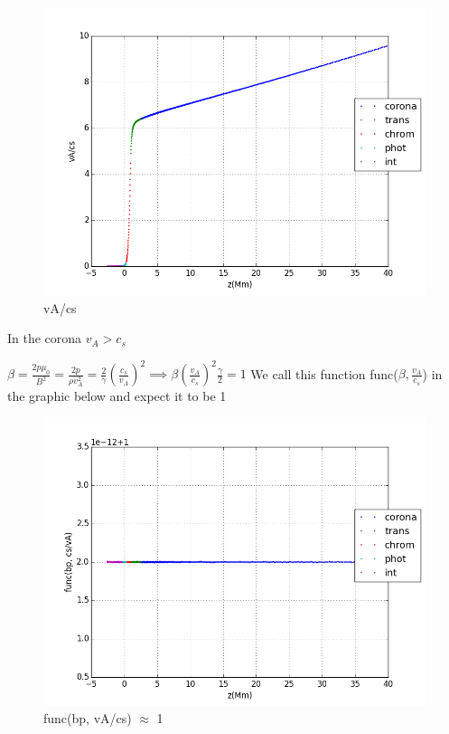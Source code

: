 \documentclass[10pt]{book}
\begin{document}
\begin{figure}[H]
 \centering
 \includegraphics[scale=0.5]{fromFile6.png}
 \caption{vA/cs}
\end{figure}

In the corona $v_A > c_s$



$\beta = \frac{2 p \mu_0}{B^2} = \frac{2 p}{\rho v_A^2} = \frac{2 }{\gamma}(\frac{c_s}{v_A})^2
\implies \beta (\frac{v_A}{c_s})^2 \frac{\gamma}{2} = 1 $
We call this function func($\beta, \frac{v_A}{c_s}$) in the graphic below and expect it to be 1



\begin{figure}[H]
 \centering
 \includegraphics[scale=0.5]{fromFile7.png}
 \caption{func(bp, vA/cs) $\approx$ 1}
\end{figure}
\end{document}
